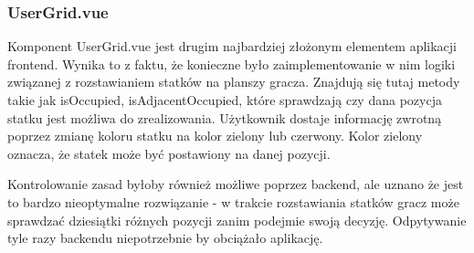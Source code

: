 \subsubsection{UserGrid.vue}
Komponent UserGrid.vue jest drugim najbardziej złożonym elementem aplikacji frontend. Wynika to z faktu, że konieczne było zaimplementowanie w nim logiki związanej z rozstawianiem statków na planszy gracza. Znajdują się tutaj metody takie jak isOccupied, isAdjacentOccupied, które sprawdzają czy dana pozycja statku jest możliwa do zrealizowania. Użytkownik dostaje informację zwrotną poprzez zmianę koloru statku na kolor zielony lub czerwony. Kolor zielony oznacza, że statek może być postawiony na danej pozycji.

Kontrolowanie zasad byłoby również możliwe poprzez backend, ale uznano że jest to bardzo nieoptymalne rozwiązanie - w trakcie rozstawiania statków gracz może sprawdzać dziesiątki różnych pozycji zanim podejmie swoją decyzję. Odpytywanie tyle razy backendu niepotrzebnie by obciążało aplikację.


